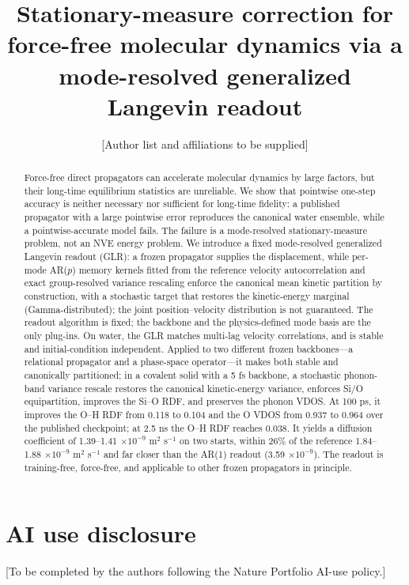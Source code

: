 \documentclass[11pt]{article}
\title{Stationary-measure correction for force-free molecular dynamics via a
mode-resolved generalized Langevin readout}
\author{[Author list and affiliations to be supplied]}
\date{}
\begin{document}
\maketitle
\linenumbers

\begin{abstract}
Force-free direct propagators can accelerate molecular dynamics by large factors, but their
long-time equilibrium statistics are unreliable. We show that pointwise one-step accuracy is
neither necessary nor sufficient for long-time fidelity: a published propagator with a large
pointwise error reproduces the canonical water ensemble, while a pointwise-accurate model fails.
The failure is a mode-resolved stationary-measure problem, not an NVE energy problem. We
introduce a fixed mode-resolved generalized Langevin readout (GLR): a frozen propagator supplies
the displacement, while per-mode AR($p$) memory kernels fitted from the reference velocity
autocorrelation and exact group-resolved variance rescaling enforce the canonical mean kinetic
partition by construction, with a stochastic target that restores the kinetic-energy marginal
(Gamma-distributed); the joint position--velocity distribution is not guaranteed. The
readout algorithm is fixed; the backbone and the physics-defined mode basis are the only plug-ins.
On water, the GLR matches multi-lag velocity
correlations, and is stable and initial-condition independent. Applied to two different frozen
backbones---a relational propagator and a phase-space operator---it makes both stable and
canonically partitioned; in a covalent solid with a 5 fs backbone, a stochastic phonon-band
variance rescale restores the canonical kinetic-energy variance, enforces Si/O equipartition,
improves the Si--O RDF, and preserves the phonon VDOS. At
100 ps, it improves the
O--H RDF from 0.118 to 0.104 and the O VDOS from 0.937 to 0.964 over the published checkpoint; at
2.5 ns the O--H RDF reaches 0.038. It yields a diffusion coefficient of
1.39--1.41 $\times 10^{-9}$ m$^2$ s$^{-1}$ on two starts,
within 26\% of the reference 1.84--1.88 $\times 10^{-9}$ m$^2$ s$^{-1}$ and far closer than the
AR(1) readout (3.59 $\times 10^{-9}$). The readout is training-free, force-free, and applicable
to other frozen propagators in principle.
\end{abstract}






\section*{AI use disclosure}
[To be completed by the authors following the Nature Portfolio AI-use policy.]



\end{document}
